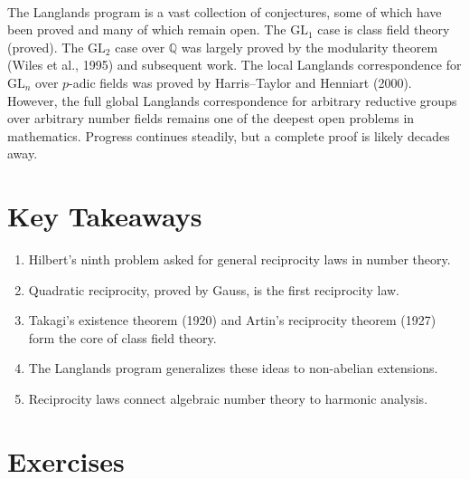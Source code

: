 \begin{description}[font=\bfseries, leftmargin=2em, style=nextline]
\item[Q: Is the Langlands program proven or still a conjecture?]\hfill\\
The Langlands program is a vast collection of conjectures, some of which have been proved and many of which remain open. The $\mathrm{GL}_1$ case is class field theory (proved). The $\mathrm{GL}_2$ case over $\mathbb{Q}$ was largely proved by the modularity theorem (Wiles et al., 1995) and subsequent work. The local Langlands correspondence for $\mathrm{GL}_n$ over $p$-adic fields was proved by Harris--Taylor and Henniart (2000). However, the full global Langlands correspondence for arbitrary reductive groups over arbitrary number fields remains one of the deepest open problems in mathematics. Progress continues steadily, but a complete proof is likely decades away.

\end{description}

\section*{Key Takeaways}

\begin{enumerate}
    \item Hilbert's ninth problem asked for general reciprocity laws in number theory.
    \item Quadratic reciprocity, proved by Gauss, is the first reciprocity law.
    \item Takagi's existence theorem (1920) and Artin's reciprocity theorem (1927) form the core of class field theory.
    \item The Langlands program generalizes these ideas to non-abelian extensions.
    \item Reciprocity laws connect algebraic number theory to harmonic analysis.
\end{enumerate}

\section*{Exercises}

